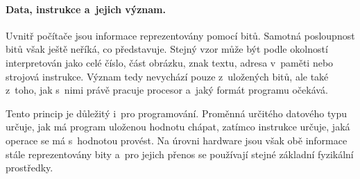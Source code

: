 
\paragraph{Data, instrukce a~jejich význam.}

Uvnitř počítače jsou informace reprezentovány pomocí bitů. Samotná posloupnost bitů však ještě neříká, co představuje. Stejný vzor může být podle okolností interpretován jako celé číslo, část obrázku, znak textu, adresa v~paměti nebo strojová instrukce. Význam tedy nevychází pouze z~uložených bitů, ale také z~toho, jak s~nimi právě pracuje procesor a~jaký formát programu očekává.

Tento princip je důležitý i~pro programování. Proměnná určitého datového typu určuje, jak má program uloženou hodnotu chápat, zatímco instrukce určuje, jaká operace se má s~hodnotou provést. Na úrovni hardware jsou však obě informace stále reprezentovány bity a~pro jejich přenos se používají stejné základní fyzikální prostředky.

